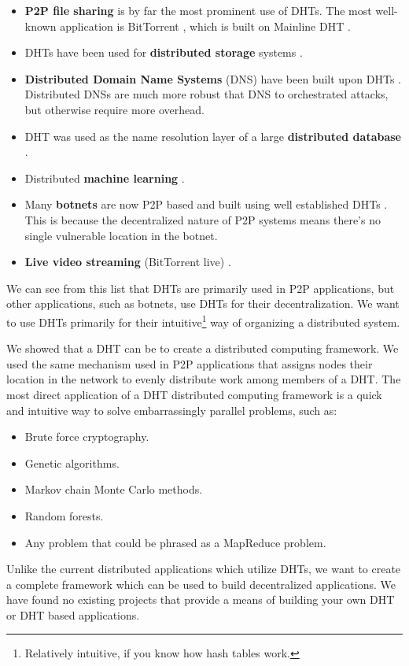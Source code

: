 \begin{itemize}
	\item \textbf{P2P file sharing} is by far the most prominent use of DHTs.  
	The most well-known application is BitTorrent \cite{bittorrent}, which is built on Mainline DHT \cite{mainline}.
	\item DHTs have been used for \textbf{distributed storage} systems \cite{CFS}.
	\item \textbf{Distributed Domain Name Systems} (DNS) have been built upon DHTs \cite{cox2002serving} \cite{pappas2006comparative}.
	Distributed DNSs are much more robust that DNS to orchestrated attacks, but otherwise require more overhead.
	\item DHT was used as the name resolution layer of a large \textbf{distributed database} \cite{Mateescu2011440}.
	\item Distributed \textbf{machine learning} \cite{liparameter}.
	\item Many \textbf{botnets} are now P2P based and built using well established DHTs \cite{saad2011detecting}. 
	This is because the decentralized nature of P2P systems means there's no single vulnerable location in the botnet.
	\item \textbf{Live video streaming} (BitTorrent live) \cite{mol2009design}.
\end{itemize}

We can see from this list that DHTs are primarily used in P2P applications, but other applications, such as botnets, use DHTs for their decentralization.
We want to use DHTs primarily for their intuitive\footnote{Relatively intuitive, if you know how hash tables work.} way of organizing a distributed system.

We showed  \cite{chordreduce} that a DHT can be to create a distributed computing framework.
We used the same mechanism used in P2P applications that assigns nodes their location in the network to evenly distribute work among members of a DHT.
The most direct application of a DHT distributed computing framework is  a quick and intuitive way to solve embarrassingly parallel problems, such as:
\begin{itemize}
	\item Brute force cryptography.
	\item Genetic algorithms.
	\item Markov chain Monte Carlo methods.
	\item Random forests.
	\item Any problem that could be phrased as a MapReduce problem.
	
\end{itemize}
Unlike the current distributed applications which utilize DHTs, we want to create a complete framework which can be used to build decentralized applications.
We have found no existing projects that provide a means of building your own DHT or DHT based applications. %


